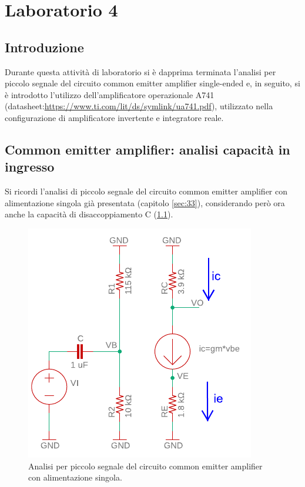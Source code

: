 \chapter{Laboratorio 4}
\section{Introduzione}
Durante questa attività di laboratorio si è dapprima terminata l'analisi per piccolo segnale del circuito common emitter amplifier single-ended e, in seguito, si è introdotto l'utilizzo dell'amplificatore operazionale \textmu A741 (datasheet:\url{https://www.ti.com/lit/ds/symlink/ua741.pdf}), utilizzato nella configurazione di amplificatore invertente e integratore reale.

\section{Common emitter amplifier: analisi capacità in ingresso}
Si ricordi l'analisi di piccolo segnale del circuito common emitter amplifier con alimentazione singola già presentata (capitolo \ref{sec:33}), considerando però ora anche la capacità di disaccoppiamento C (\Fig\ref{fig:commonemitter_se_c_AC}).
\begin{figure}[h!]
	\centering
	\includegraphics[width=0.4\linewidth]{./OtherFiles/Laboratorio 4/common emitter_se_c-piccolo segnale-printout}
	\caption{Analisi per piccolo segnale del circuito common emitter amplifier con alimentazione singola.}
	\label{fig:commonemitter_se_c_AC}
\end{figure}

